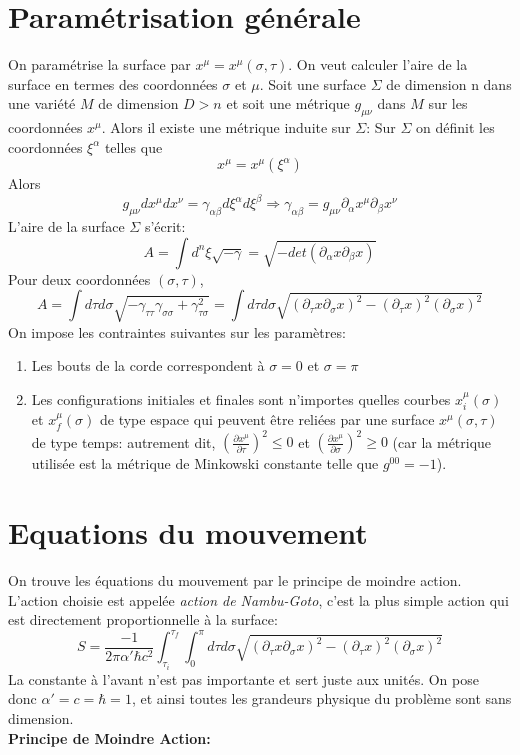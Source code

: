 \documentclass[a4paper,12pt]{article}
\def\xmu{x^\mu}
\begin{document}
\section{Paramétrisation générale}
On paramétrise la surface par $x^{\mu}=x^{\mu}(\sigma,\tau)$. On veut calculer l'aire de la surface en termes des coordonnées $\sigma$ et $\mu$.
Soit une surface $\Sigma$ de dimension n dans une variété $M$ de dimension $D>n$ et soit une métrique $g_{\mu\nu}$ dans $M$ sur les coordonnées $\xmu$. Alors il existe une métrique induite sur $\Sigma$:
Sur $\Sigma$ on définit les coordonnées $\xi^\alpha$ telles que 
$$\xmu=\xmu(\xi^\alpha) $$
Alors $$g_{\mu\nu}d\xmu dx^\nu=\gamma_{\alpha\beta}d\xi^\alpha d\xi^\beta \Rightarrow \gamma_{\alpha\beta}=g_{\mu\nu}\partial_\alpha\xmu\partial_\beta x^\nu$$
L'aire de la surface $\Sigma$ s'écrit: $$A=\int d^n\xi\sqrt{-\gamma}=\sqrt{-det(\partial_\alpha x\partial_\beta x)}$$
Pour deux coordonnées $(\sigma,\tau)$, $$A=\int d\tau d\sigma \sqrt{-\gamma_{\tau\tau}\gamma_{\sigma\sigma}+\gamma^2_{\tau\sigma}}=\int d\tau d\sigma \sqrt{(\partial_\tau x \partial_\sigma x)^2-(\partial_\tau x)^2(\partial_\sigma x)^2}$$
On impose les contraintes suivantes sur les paramètres:
\begin{enumerate}
\item Les bouts de la corde correspondent à $\sigma=0$ et $\sigma=\pi$
\item Les configurations initiales et finales sont n'importes quelles courbes $x^{\mu}_{i}(\sigma)$ et $x^{\mu}_{f}(\sigma)$  de type espace qui peuvent être reliées par une surface $x^{\mu}(\sigma,\tau)$ de type temps:
autrement dit, $\left( \frac{\partial x^{\mu}}{\partial \tau}\right)^{2}\leq 0 $ et $\left( \frac{\partial x^{\mu}}{\partial \sigma}\right)^{2}\geq 0 $ (car la métrique utilisée est la métrique de Minkowski constante telle que $g^{00}=-1$).
\end{enumerate}
\section{Equations du mouvement}
On trouve les équations du mouvement par le principe de moindre action. L'action choisie est appelée \textit{action de Nambu-Goto}, c'est la plus simple action qui est directement proportionnelle à la surface:
\begin{equation}
S=\frac{-1}{2\pi \alpha'\hbar c^{2}}\int_{\tau_{i}}^{\tau_{f}}\int_{0}^{\pi}d\tau d\sigma \sqrt{(\partial_\tau x \partial_\sigma x)^2-(\partial_\tau x)^2(\partial_\sigma x)^2}
\end{equation} 
La constante à l'avant n'est pas importante et sert juste aux unités. On pose donc $\alpha '=c=\hbar =1$, et ainsi toutes les grandeurs physique du problème sont sans dimension.\\
\textbf{Principe de Moindre Action:} 
\end{document}
